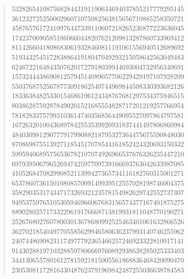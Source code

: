 \documentclass[oneside,12pt]{book}   	%
\theoremstyle{definition}
\begin{document}
\begin{spacing}{1.618}
\begin{quote}
53282654108756828443191190634694037855217779295145 \\
36123272525000296071075082563815656710885258350721 \\
45876576172410976447339110607218265236877223636045 \\
17423706905851860660448207621209813287860733969412 \\
81142660418086830619328460811191061556940512689692 \\
51934325451728388641918047049293215058642563049483 \\
62467221648435076201727918039944693004732956340691 \\
15732444386908125794514089057706229429197107928209 \\
55037687525678773091862540744969844508330393682126 \\
18336384825330154686196124348767681297534375946515 \\
80386287592878490201521685554828717201219257766954 \\
78182833757993103614740356856449095527097864797581 \\
16726320100436897842553539920931837441497806860984 \\
48403098129077791799088218795327364475675590848030 \\
87086987551392711854517078544161852424320693150332 \\
59959406895756536782107074926966537676326235447210 \\
69793950679652694742597709739166693763042633987085 \\
41052684708299085211399427365734116182760315001271 \\
65378607361501080857009149939512557028198746004375 \\
35829035317434717326932123578154982629742552737307 \\
94953759765105305946966067683156574377167401875275 \\
88902802571733229619176668713819931811048770190271 \\
25267680276078003013678680992525463401061632866526 \\
36270218540497705585629946580636237993140746255962 \\
24074486908231174977792365466257246923322810917141 \\
91430288197103288597806669760892938638285025333403 \\
34413065578016127815921815005561868836468420090470 \\
23053081172816430487623791969842487255036638784583 \\

\end{quote}
\end{spacing}
\end{document}
